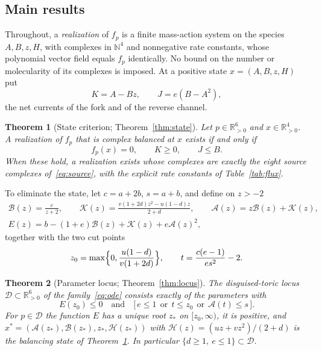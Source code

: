 \documentclass[11pt,a4paper]{article}
\theoremstyle{plain}
\newtheorem{theorem}{Theorem}[section]
\theoremstyle{definition}
\theoremstyle{remark}
\newcommand{\R}{\mathbb{R}}
\newcommand{\N}{\mathbb{N}}
\newcommand{\Rp}{\R_{>0}}
\newcommand{\DT}{\mathcal{D}}
\newcommand{\rA}{\mathcal{A}}
\newcommand{\rB}{\mathcal{B}}
\newcommand{\rK}{\mathcal{K}}
\newcommand{\rH}{\mathcal{H}}
\newcommand{\xs}{x^{*}}
\begin{document}
\subsection{Main results}\label{sec:main}

Throughout, a \emph{realization} of $f_p$ is a finite mass-action system on the species $A,B,z,H$, with complexes in $\N^4$ and nonnegative rate constants, whose polynomial vector field equals $f_p$ identically. No bound on the number or molecularity of its complexes is imposed. At a positive state $x=(A,B,z,H)$ put
\begin{equation}\label{eq:KJ}
K=A-Bz,\qquad J=e(B-A^2),
\end{equation}
the net currents of the fork and of the reverse channel.

\begin{theorem}[State criterion; Theorem~\ref{thm:state}]\label{thm:A}
Let $p\in\Rp^6$ and $x\in\Rp^4$. A realization of $f_p$ that is complex balanced at $x$ exists if and only if
\[
f_p(x)=0,\qquad K\ge0,\qquad J\le B.
\]
When these hold, a realization exists whose complexes are exactly the eight source complexes of~\eqref{eq:source}, with the explicit rate constants of Table~\ref{tab:flux}.
\end{theorem}

To eliminate the state, let $c=a+2b$, $s=a+b$, and define on $z>-2$
\begin{equation}\label{eq:reduced}
\begin{gathered}
\rB(z)=\frac{c}{z+2},\qquad
\rK(z)=\frac{v(1+2d)z^2-u(1-d)z}{2+d},\qquad
\rA(z)=z\rB(z)+\rK(z),\\
E(z)=b-(1+e)\rB(z)+\rK(z)+e\rA(z)^2,
\end{gathered}
\end{equation}
together with the two cut points
\begin{equation}\label{eq:cuts}
z_0=\max\Bigl\{0,\frac{u(1-d)}{v(1+2d)}\Bigr\},\qquad
t=\frac{c(e-1)}{es^2}-2.
\end{equation}

\begin{theorem}[Parameter locus; Theorem~\ref{thm:locus}]\label{thm:B}
The disguised-toric locus $\DT\subset\Rp^6$ of the family~\eqref{eq:ode} consists exactly of the parameters with
\[
E(z_0)\le0\quad\text{and}\quad\bigl[\,e\le1\ \ \text{or}\ \ t\le z_0\ \ \text{or}\ \ \rA(t)\le s\,\bigr].
\]
For $p\in\DT$ the function $E$ has a unique root $z_*$ on $[z_0,\infty)$, it is positive, and $\xs=(\rA(z_*),\rB(z_*),z_*,\rH(z_*))$ with $\rH(z)=(uz+vz^2)/(2+d)$ is the balancing state of Theorem~\ref{thm:A}. In particular $\{d\ge1,\ e\le1\}\subset\DT$.
\end{theorem}
\end{document}
